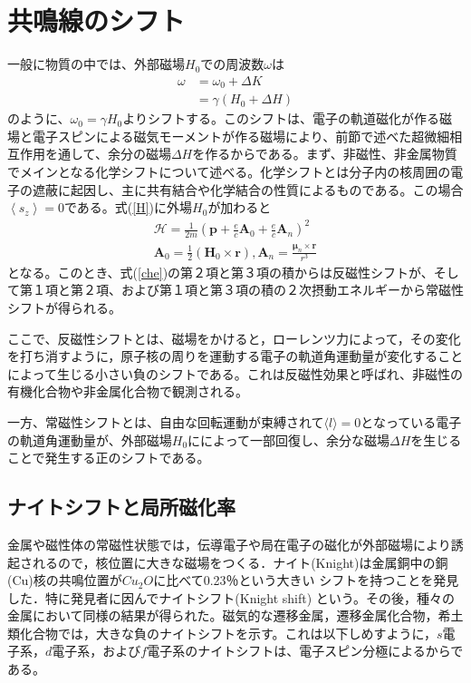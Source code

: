 \documentclass[11pt,a4j]{jreport}
\begin{document}
\section{共鳴線のシフト}
一般に物質の中では、外部磁場$H_0$での周波数$\omega$は
\begin{align}
  \omega &= \omega_0 + \Delta K \\
  &= \gamma(H_0+\Delta H)
\end{align}
のように、$\omega_0=\gamma H_0$よりシフトする。このシフトは、電子の軌道磁化が作る磁場と電子スピンによる磁気モーメントが作る磁場により、前節で述べた超微細相互作用を通して、余分の磁場$\Delta H$を作るからである。まず、非磁性、非金属物質でメインとなる化学シフトについて述べる。化学シフトとは分子内の核周囲の電子の遮蔽に起因し、主に共有結合や化学結合の性質によるものである。この場合$\left\langle s_z \right\rangle = 0$である。式(\ref{H})に外場$H_0$が加わると
\begin{align}
  \mathcal{H} = \frac{1}{2m}(\bm p + \frac{e}{c} \bm A_0 +\frac{e}{c} \bm A_n)^2\\
  \bm A_0 =\frac{1}{2}(\bm H_0 \times \bm r), \bm A_n = \frac{\bm{\mu}_n \times \bm r}{r^3}
  \label{che}
\end{align}
となる。このとき、式(\ref{che})の第２項と第３項の積からは反磁性シフトが、そして第１項と第２項、および第１項と第３項の積の２次摂動エネルギーから常磁性シフトが得られる。\par
ここで、反磁性シフトとは、磁場をかけると，ローレンツ力によって，その変化を打ち消すように，原子核の周りを運動する電子の軌道角運動量が変化することによって生じる小さい負のシフトである。これは反磁性効果と呼ばれ、非磁性の有機化合物や非金属化合物で観測される。\par
一方、常磁性シフトとは、自由な回転運動が束縛されて$\langle l \rangle =0$となっている電子の軌道角運動量が、外部磁場$H_0$にによって一部回復し、余分な磁場$\Delta H$を生じることで発生する正のシフトである。
\subsection{ナイトシフトと局所磁化率}
金属や磁性体の常磁性状態では，伝導電子や局在電子の磁化が外部磁場により誘起されるので，核位置に大きな磁場をつくる．ナイト(Knight)は金属銅中の銅(Cu)核の共鳴位置が$Cu_2O$に比べて0.23％という大きい
シフトを持つことを発見した．特に発見者に因んでナイトシフト(Knight shift) という。その後，種々の金属において同様の結果が得られた。磁気的な遷移金属，遷移金属化合物，希土類化合物では，大きな負のナイトシフトを示す。これは以下しめすように，$s$電子系，$d$電子系，および$f$電子系のナイトシフトは、電子スピン分極によるからである。
\end{document}
